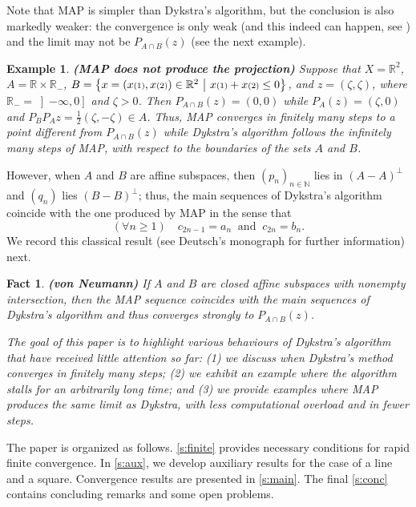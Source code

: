\documentclass[12pt]{article}
\newcommand{\nnn}{\ensuremath{{n\in{\mathbb N}}}}
\newcommand{\thalb}{\ensuremath{\tfrac{1}{2}}}
\newcommand{\menge}[2]{\big\{{#1}~\big |~{#2}\big\}}
\newcommand{\RR}{\ensuremath{\mathbb R}}
\newcommand{\RM}{\ensuremath{\mathbb{R}_-}}
\newtheorem{example}[theorem]{Example}
\newtheorem{fact}[theorem]{Fact}
\providecommand{\RR}{\mathbb{R}}
\providecommand{\RR}{\mathbb{R}}
\newcommand{\eins}{\ensuremath{\textstyle\mathsmaller{({1})}}}
\newcommand{\zwei}{\ensuremath{\textstyle\mathsmaller{({2})}}}
\begin{document}
Note that MAP is simpler than Dykstra's algorithm, but the conclusion 
is also markedly weaker: the convergence is only weak 
(and this indeed can happen, see \cite{Hundal}) and the limit may 
not be $P_{A\cap B}(z)$ (see the next example). 

\begin{example}{\rm\bf (MAP does not produce the projection)}
\label{ex:MAPbad}
Suppose that $X=\RR^2$, 
$A = \RR\times\RM$,
$B = \menge{x=(x\eins,x\zwei)\in\RR^2}{x\eins+x\zwei\leq 0}$,
and $z = (\zeta,\zeta)$, where $\RM = \left]-\infty,0\right]$ and $\zeta > 0$.  
Then $P_{A\cap B}(z) = (0,0)$ while 
$P_A(z) = (\zeta,0)$ and $P_BP_Az = \thalb(\zeta,-\zeta)\in A$. 
Thus, MAP converges in finitely many steps to a point different from
$P_{A\cap B}(z)$ while Dykstra's algorithm follows 
the infinitely many steps of MAP, 
with respect to the boundaries of the sets $A$ and $B$. 
\end{example}

However, when $A$ and $B$ are affine subspaces,
then $(p_n)_\nnn$ lies in $(A-A)^\perp$ and 
$(q_n)$ lies $(B-B)^\perp$; thus, 
the main sequences of Dykstra's algorithm coincide with 
the one produced by MAP in the sense that 
\begin{equation}
(\forall n\geq 1)\quad
c_{2n-1} = a_n 
\;\;\text{and}\;\;
c_{2n} = b_n.
\end{equation}
We record this classical result 
(see Deutsch's monograph \cite{Deutsch} for further information) next.

\begin{fact} {\rm\bf (von Neumann)}
\label{f:vN}
If $A$ and $B$ are closed affine subspaces with nonempty intersection, 
then the MAP sequence coincides with the main sequences of 
Dykstra's algorithm and thus converges strongly to $P_{A\cap B}(z)$.
\end{fact}

\emph{
The goal of this paper is to highlight various behaviours of 
Dykstra's algorithm that have received little attention so far:
(1) we discuss when Dykstra's method converges in finitely many steps;
(2) we exhibit an example where the algorithm stalls 
for an arbitrarily long time; and (3) we provide examples where 
MAP produces the same limit as Dykstra, with less computational 
overload and in fewer steps.
}

The paper is organized as follows.
\cref{s:finite} provides necessary conditions for rapid finite convergence.
In \cref{s:aux}, we develop auxiliary results for the case of a line and
a square. 
Convergence results are presented in \cref{s:main}.
The final \cref{s:conc} contains concluding remarks and 
some open problems.
\end{document}
